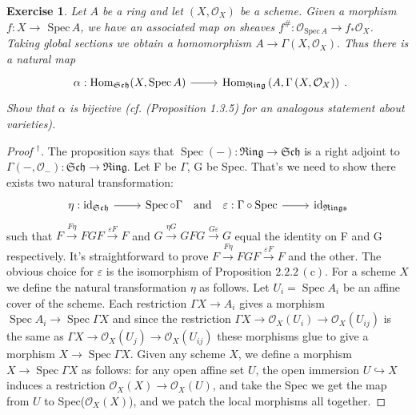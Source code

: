 \documentclass{amsart}
\newtheorem{exe}{Exercise}[subsection]
\theoremstyle{remark}\newtheorem{rmk}[theorem]{Remark}
\begin{document}
\begin{exe}
	\label{2.2.4}
Let $A$ be a ring and let $(X, \mathcal{O}_{X}) $ be a scheme. Given a morphism $f: X \rightarrow$ $\mathrm{Spec}\, A$, we have an associated map on sheaves $f^{\#}: \mathcal{O}_{\mathrm{Spec}\, A} \rightarrow f_{*} \mathcal{O}_{X}$. Taking global sections we obtain a homomorphism $A \rightarrow \Gamma\left(X, \mathcal{O}_{X}\right) .$ Thus there is a natural map
\begin{equation*}
	\begin{tikzcd}
		{\alpha: \operatorname{Hom}_{\mathfrak{S c h}}(X, \operatorname{Spec} A)} \arrow[r] & {\operatorname{Hom}_{\mathfrak{R i n g}}\left(A, \Gamma\left(X, \mathcal{O}_{X}\right)\right)}
	\end{tikzcd}.
\end{equation*}
Show that $\alpha$ is bijective \textup{(cf. (Proposition 1.3.5) for an analogous statement about varieties)}.
\end{exe}
\begin{proof}[Proof $^\dag$]
The proposition says that $\operatorname{Spec}(-):\mathfrak{R i n g} \rightarrow \mathfrak{Sch} $ is a right adjoint to $\Gamma\left(-, \mathcal{O}_{-}\right): \mathfrak{S c h} \rightarrow \mathfrak{R i n g}$.  Let F be $\Gamma$, G be Spec. That's we need to show there exists two natural transformation:
\begin{equation*}
	\begin{tikzcd}
		\eta: \mathrm{i d}_{\mathfrak{S c h}} \arrow[r] & \operatorname{Spec} \circ \Gamma\quad \text{and}\quad \varepsilon:\Gamma \circ \mathrm{Spec} \arrow[r] & \mathrm{i d}_{\mathfrak{Rings}}
	\end{tikzcd}
\end{equation*}
such that
$F \xrightarrow{F \eta} F G F \xrightarrow{\varepsilon F} F$ and $G \xrightarrow{\eta G}G F G \xrightarrow{G \varepsilon} G$ equal the identity on F and G respectively. It's straightforward to prove $F \xrightarrow{F \eta} F G F \xrightarrow{\varepsilon F} F$ and the other. The obvious choice for $\varepsilon$ is the isomorphism of Proposition $2.2.2\,(\mathrm{c})$.  For a scheme $X$ we define the natural transformation $\eta$ as follows. Let $U_{i}=\operatorname{Spec} A_{i}$ be an affine cover of the scheme. Each restriction $\Gamma X \rightarrow A_{i}$ gives a morphism $\operatorname{Spec} A_{i} \rightarrow \operatorname{Spec} \Gamma X$ and since the restriction $\Gamma X \rightarrow \mathcal{O}_{X}\left(U_{i}\right) \rightarrow \mathcal{O}_{X}\left(U_{i j}\right)$ is the
same as $\Gamma X \rightarrow \mathcal{O}_{X}\left(U_{j}\right) \rightarrow \mathcal{O}_{X}\left(U_{i j}\right)$ these morphisms glue to give a morphism $X \rightarrow \operatorname{Spec} \Gamma X$. Given any scheme $X$, we define a morphism $X \rightarrow \operatorname{Spec} \Gamma X$ as follows: for any open affine set $U$, the open immersion $U\hookrightarrow X$ induces a restriction $\mathcal{O}_{X}(X)\rightarrow \mathcal{O}_{X}(U)$, and take the Spec we get the map from $U$ to Spec($\mathcal{O}_{X}(X)$), and we patch the local morphisms all together.
\end{proof}
\end{document}
